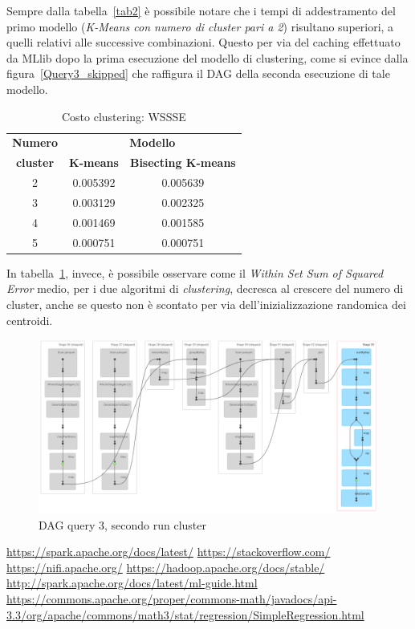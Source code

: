 \documentclass[conference]{IEEEtran}
\begin{document}
\par Sempre dalla tabella~\ref{tab2} \`{e} possibile notare che i tempi di addestramento del primo modello (\emph{K-Means con numero di cluster pari a 2}) risultano superiori, a quelli relativi alle successive combinazioni. Questo per via del caching effettuato da MLlib dopo la prima esecuzione del modello di clustering, come si evince dalla figura~\ref{Query3_skipped} che raffigura il DAG della seconda esecuzione di tale modello. 
\begin{table}[htbp]
\caption{Costo clustering: WSSSE}
\begin{center}
\begin{tabular}{|c|c|c|}
\hline
\textbf{Numero}&\multicolumn{2}{|c|}{\textbf{Modello}} \\ \cline{2-3}
\textbf{cluster} & \multicolumn{1}{|c|}{\textbf{K-means}} & \multicolumn{1}{|c|}{\textbf{Bisecting K-means}} \\ \hline
2 & 0.005392 & 0.005639 \\ \hline
3 & 0.003129 & 0.002325 \\ \hline
4 & 0.001469 & 0.001585 \\ \hline
5 & 0.000751 & 0.000751 \\ \hline
\end{tabular}
\label{tab3}
\end{center}
\end{table}
\par In tabella~\ref{tab3}, invece, \`{e} possibile osservare come il \emph{Within Set Sum of Squared Error} medio, per i due algoritmi di \emph{clustering}, decresca al crescere del numero di cluster, anche se questo non \`{e} scontato per via dell'inizializzazione randomica dei centroidi. 
\begin{figure}[htbp]
\includegraphics[scale=0.196]{Screenshot/Query3_skipped.png}
\caption{DAG query 3, secondo run cluster}\label{Query3_skipped}
\label{fig}
\end{figure}


\begin{thebibliography}{00}
 \url{https://spark.apache.org/docs/latest/}
 \url{https://stackoverflow.com/}
 \url{https://nifi.apache.org/}
 \url{https://hadoop.apache.org/docs/stable/}
 \url{http://spark.apache.org/docs/latest/ml-guide.html}
 \url{https://commons.apache.org/proper/commons-math/javadocs/api-3.3/org/apache/commons/math3/stat/regression/SimpleRegression.html}
\end{thebibliography}
\end{document}

